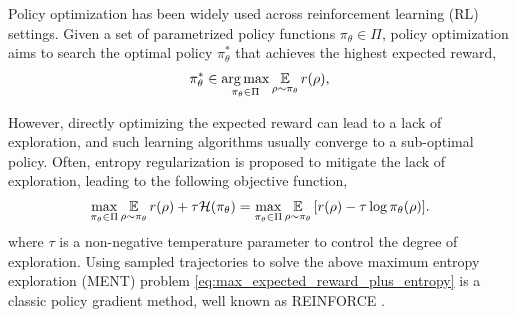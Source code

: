 Policy optimization has been widely used across reinforcement learning (RL) settings. Given a set of parametrized policy functions $\pi_\theta \in \Pi$, policy optimization aims to search the optimal policy $\pi_\theta^*$ that achieves the highest expected reward,
\begin{equation}
\label{max_expected_reward}
\begin{split}
\pi_\theta^* \in \operatorname*{arg\,max}_{\pi_\theta \in \Pi}{ \operatorname*{\mathbb{E}}\limits_{\rho \sim \pi_\theta}{r(\rho)} },
\end{split}
\end{equation}


However, directly optimizing the expected reward can lead to a lack of exploration, and such learning algorithms usually converge to a sub-optimal policy.
Often, entropy regularization is proposed to mitigate the lack of exploration, leading to the following objective function,
\begin{equation}
\label{eq:max_expected_reward_plus_entropy}
\begin{split}
	\max\limits_{\pi_\theta \in \Pi}{ \operatorname*{\mathbb{E}}\limits_{\rho \sim \pi_\theta}{  r(\rho) } + \tau \mathcal{H}(\pi_\theta) } = 
	\max\limits_{\pi_\theta \in \Pi}{ \operatorname*{\mathbb{E}}\limits_{\rho \sim \pi_\theta}{ \left[ r(\rho) - \tau \log{\pi_\theta(\rho)} \right] } }.
\end{split}
\end{equation}
where $\tau$ is a non-negative temperature parameter to control the degree of exploration. Using sampled trajectories to solve the above maximum entropy exploration (MENT) problem \cref{eq:max_expected_reward_plus_entropy} is a classic policy gradient method, well known as REINFORCE \citep{williams1992simple,williams1991function}.

